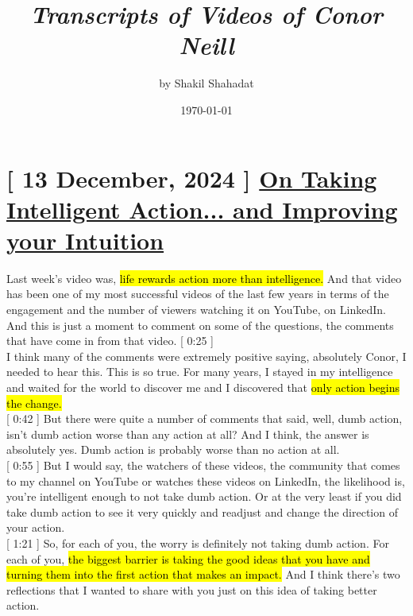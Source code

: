 \documentclass[a4paper,12pt]{article}
\begin{document}
\title{ \textit{Transcripts of Videos of Conor Neill}  }
	\author{ by Shakil Shahadat }
	\date{ \today }
\maketitle

\thispagestyle{empty}

\newpage




\section{ [ 13 December, 2024 ] \href{https://www.youtube.com/watch?v=5dC5g7wgxOA}{On Taking Intelligent Action... and Improving your Intuition} }


Last week's video was, \hl{life rewards action more than intelligence.} And that video has been one of my most successful videos of the last few years in terms of the engagement and the number of viewers watching it on YouTube, on LinkedIn. And this is just a moment to comment on some of the questions, the comments that have come in from that video. [ 0:25 ] \\

I think many of the comments were extremely positive saying, absolutely Conor, I needed to hear this. This is so true. For many years, I stayed in my intelligence and waited for the world to discover me and I discovered that \hl{only action begins the change.} \\
 
[ 0:42 ] But there were quite a number of comments that said, well, dumb action, isn't dumb action worse than any action at all? And I think, the answer is absolutely yes. Dumb action is probably worse than no action at all. \\

[ 0:55 ] But I would say, the watchers of these videos, the community that comes to my channel on YouTube or watches these videos on LinkedIn, the likelihood is, you're intelligent enough to not take dumb action. Or at the very least if you did take dumb action to see it very quickly and readjust and change the direction of your action. \\

[ 1:21 ] So, for each of you, the worry is definitely not taking dumb action. For each of you, \hl{the biggest barrier is taking the good ideas that you have and turning them into the first action that makes an impact.} And I think there's two reflections that I wanted to share with you just on this idea of taking better action. \\
\end{document}
